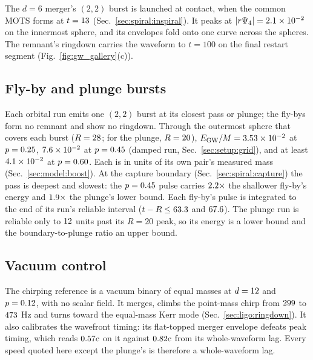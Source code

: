\documentclass[twocolumn,floatfix,aps,prd,superscriptaddress,nofootinbib,showkeys]{revtex4-2}
\begin{document}
The $d=6$ merger's $(2,2)$ burst is launched at contact, when the common MOTS forms at $t=13$ (Sec.~\ref{sec:spiral:inspiral}). It peaks at $|r\Psi_4|=2.1\times10^{-2}$ on the innermost sphere, and its envelopes fold onto one curve across the spheres. The remnant's ringdown carries the waveform to $t=100$ on the final restart segment (Fig.~\ref{fig:gw_gallery}(c)).

\subsection{Fly-by and plunge bursts}
\label{sec:gw:flyby}

Each orbital run emits one $(2,2)$ burst at its closest pass or plunge; the fly-bys form no remnant and show no ringdown. Through the outermost sphere that covers each burst ($R=28$; for the plunge, $R=20$), $E_{\rm GW}/M=3.53\times10^{-2}$ at $p=0.25$, $7.6\times10^{-2}$ at $p=0.45$ (damped run, Sec.~\ref{sec:setup:grid}), and at least $4.1\times10^{-2}$ at $p=0.60$. Each is in units of its own pair's measured mass (Sec.~\ref{sec:model:boost}). At the capture boundary (Sec.~\ref{sec:spiral:capture}) the pass is deepest and slowest: the $p=0.45$ pulse carries $2.2\times$ the shallower fly-by's energy and $1.9\times$ the plunge's lower bound. Each fly-by's pulse is integrated to the end of its run's reliable interval ($t-R\le63.3$ and $67.6$). The plunge run is reliable only to $12$ units past its $R=20$ peak, so its energy is a lower bound and the boundary-to-plunge ratio an upper bound.

\subsection{Vacuum control}
\label{sec:controls:bbh}

The chirping reference is a vacuum binary of equal masses at $d=12$ and $p=0.12$, with no scalar field. It merges, climbs the point-mass chirp from $299$ to $473$ Hz and turns toward the equal-mass Kerr mode (Sec.~\ref{sec:ligo:ringdown}). It also calibrates the wavefront timing: its flat-topped merger envelope defeats peak timing, which reads $0.57{}c$ on it against $0.82{}c$ from its whole-waveform lag. Every speed quoted here except the plunge's is therefore a whole-waveform lag.
\end{document}
